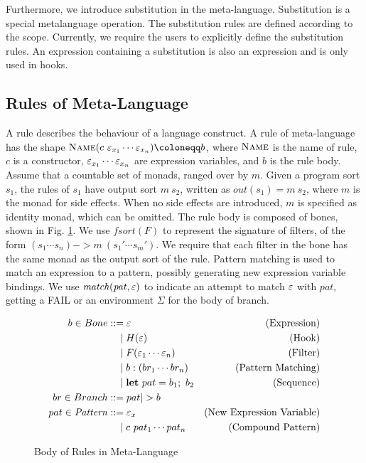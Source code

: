 Furthermore, we introduce substitution in the meta-language.
Substitution is a special metalanguage operation. %
The substitution rules are defined according to the scope.
Currently, we require the users to explicitly define the substitution rules.
An expression containing a substitution is also an expression and is only used in hooks.

\subsection{Rules of Meta-Language}

A rule describes the behaviour of a language construct.
A rule of meta-language has the shape $\ctr{Name}{c~\mexp_{x_1}\cdots \mexp_{x_n}} \cqq b$, 
where $\textsc{Name}$ is the name of rule,
$c$ is a constructor, 
$\varepsilon_{x_1}\cdots \varepsilon_{x_n}$ are expression variables,
and $b$ is the rule body.
Assume that a countable set of monads, ranged over by $m$.
Given a program sort $s_1$, the rules of $s_1$ have output sort $m~s_2$,
 written as $out(s_1)=m~s_2$,
 where $m$ is the monad for side effects.
When no side effects are introduced, $m$ is specified as identity monad, which can be omitted.
The rule body is composed of bones, shown in Fig. \ref{fig:body}.
We use $\mathit{fsort}(F)$ to represent the signature of filters, of the form $(s_1\cdots s_n) -> m~(s_1'\cdots s_m')$.
We require that each filter in the bone has the same monad as the output sort of the rule.
Pattern matching is used to match an expression to a pattern, possibly generating new expression variable bindings.
We use $\mathit{match(pat,\varepsilon)}$ to indicate an attempt to match $\varepsilon$ with $pat$,
 getting a FAIL or an environment $Σ$ for the body of branch.

\begin{figure}
  \begin{align*}
    b \in Bone 
      & ::= \mexp & \text{(Expression)} \\
      & \quad \mid H(\mexp) & \text{(Hook)} \\
      & \quad \mid F(\mexp_1\cdots \mexp_n) & \text{(Filter)} \\
      & \quad \mid b:(br_1\cdots br_n) & \text{(Pattern Matching)} \\
      & \quad \mid \Let{pat}{b_1} b_2 & \text{(Sequence)} \\
    br \in Branch
      & ::= pat |> b \\
    pat \in \mathit{Pattern}
      & ::= \mexp_x & \text{(New Expression Variable)} \\
      & \quad \mid c~pat_1\cdots pat_n & \text{(Compound Pattern)}
  \end{align*}
\caption{Body of Rules in Meta-Language}
\label{fig:body}
\end{figure}


